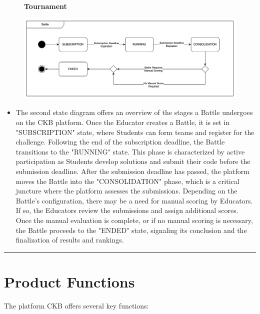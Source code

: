 \documentclass{Configuration_Files/Template}
\begin{document}
\begin{figure}[H]
\textbf{Tournament}\par\medskip
\includegraphics[scale = 0.45]{Images/StateCharts/BattleStateDiagram.png}\\
\centering
\end{figure}

\begin{itemize}
\item The second state diagram offers an overview of the stages a Battle undergoes on the CKB platform. Once the Educator creates a Battle, it is set in "SUBSCRIPTION" state, where Students can form teams and register for the challenge. Following the end of the subscription deadline, the Battle transitions to the "RUNNING" state. This phase is characterized by active participation as Students develop solutions and submit their code before the submission deadline. After the submission deadline has passed, the platform moves the Battle into the "CONSOLIDATION" phase, which is a critical juncture where the platform assesses the submissions. Depending on the Battle's configuration, there may be a need for manual scoring by Educators. If so, the Educators review the submissions and assign additional scores. Once the manual evaluation is complete, or if no manual scoring is necessary, the Battle proceeds to the "ENDED" state, signaling its conclusion and the finalization of results and rankings.
\end{itemize}

{\color{bluepoli}\rule{\linewidth}{0.1pt}}

\section{Product Functions}

The platform CKB offers several key functions:
\end{document}
